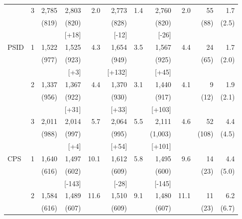 \documentclass[12pt]{article}
\begin{document}
\begin{table}[p]
{\begin{minipage}{\linewidth}
{\begin{tabular*}{\linewidth}{@{\extracolsep{\fill}}lcrrrrrrrrr@{}}
 & 3 & 2,785 & 2,803 & 2.0 & 2,773 & 1.4 & 2,760 & 2.0 & 55 & 1.7\\[-1pt]
 &  & {\footnotesize (819)} & {\footnotesize (820)} &  & {\footnotesize (828)} &  & {\footnotesize (820)} &  & {\footnotesize (88)} & {\footnotesize (2.5)}\\[-1pt]
 &  &  & {\footnotesize [+18]} &  & {\footnotesize [-12]} &  & {\footnotesize [-26]} &  &  & \\[2pt]
\midrule
PSID & 1 & 1,522 & 1,525 & 4.3 & 1,654 & 3.5 & 1,567 & 4.4 & 24 & 1.7\\[-1pt]
 &  & {\footnotesize (977)} & {\footnotesize (923)} &  & {\footnotesize (949)} &  & {\footnotesize (925)} &  & {\footnotesize (65)} & {\footnotesize (2.0)}\\[-1pt]
 &  &  & {\footnotesize [+3]} &  & {\footnotesize [+132]} &  & {\footnotesize [+45]} &  &  & \\[4pt]
 & 2 & 1,337 & 1,367 & 4.4 & 1,370 & 3.1 & 1,440 & 4.1 & 9 & 1.9\\[-1pt]
 &  & {\footnotesize (956)} & {\footnotesize (922)} &  & {\footnotesize (930)} &  & {\footnotesize (917)} &  & {\footnotesize (12)} & {\footnotesize (2.1)}\\[-1pt]
 &  &  & {\footnotesize [+31]} &  & {\footnotesize [+33]} &  & {\footnotesize [+103]} &  &  & \\[4pt]
 & 3 & 2,011 & 2,014 & 5.7 & 2,064 & 5.5 & 2,111 & 4.6 & 52 & 4.4\\[-1pt]
 &  & {\footnotesize (988)} & {\footnotesize (997)} &  & {\footnotesize (995)} &  & {\footnotesize (1,003)} &  & {\footnotesize (108)} & {\footnotesize (4.5)}\\[-1pt]
 &  &  & {\footnotesize [+4]} &  & {\footnotesize [+54]} &  & {\footnotesize [+101]} &  &  & \\[2pt]
\midrule
CPS & 1 & 1,640 & 1,497 & 10.1 & 1,612 & 5.8 & 1,495 & 9.6 & 14 & 4.4\\[-1pt]
 &  & {\footnotesize (616)} & {\footnotesize (602)} &  & {\footnotesize (609)} &  & {\footnotesize (600)} &  & {\footnotesize (23)} & {\footnotesize (5.0)}\\[-1pt]
 &  &  & {\footnotesize [-143]} &  & {\footnotesize [-28]} &  & {\footnotesize [-145]} &  &  & \\[4pt]
 & 2 & 1,584 & 1,489 & 11.6 & 1,510 & 9.1 & 1,480 & 11.1 & 11 & 6.2\\[-1pt]
 &  & {\footnotesize (616)} & {\footnotesize (607)} &  & {\footnotesize (609)} &  & {\footnotesize (607)} &  & {\footnotesize (23)} & {\footnotesize (6.7)}\\[-1pt]

\end{tabular*}}
\end{minipage}}
\end{table}
\end{document}
